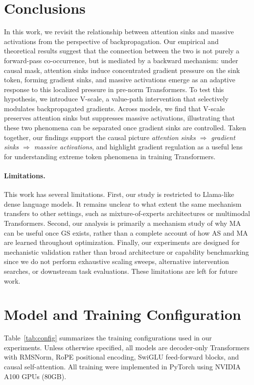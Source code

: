 \documentclass{article}
\theoremstyle{plain}
\theoremstyle{definition}
\theoremstyle{remark}
\begin{document}
\section{Conclusions}
In this work, we revisit the relationship between attention sinks and massive activations from the perspective of backpropagation.
Our empirical and theoretical results suggest that the connection between the two is not purely a forward-pass co-occurrence, but is mediated by a backward mechanism: under causal mask, attention sinks induce concentrated gradient pressure on the sink token, forming gradient sinks, and massive activations emerge as an adaptive response to this localized pressure in pre-norm Transformers.
To test this hypothesis, we introduce V-scale, a value-path intervention that selectively modulates backpropagated gradients. Across models, we find that V-scale preserves attention sinks but suppresses massive activations, illustrating that these two phenomena can be separated once gradient sinks are controlled.
Taken together, our findings support the causal picture \emph{attention sinks $\Rightarrow$ gradient sinks $\Rightarrow$ massive activations}, and highlight gradient regulation as a useful lens for understanding extreme token phenomena in training Transformers.

\paragraph{Limitations.} 
This work has several limitations.
First, our study is restricted to Llama-like dense language models. It remains unclear to what extent the same mechanism transfers to other settings, such as mixture-of-experts architectures or multimodal Transformers.
Second, our analysis is primarily a mechanism study of why MA can be useful once GS exists, rather than a complete account of how AS and MA are learned throughout optimization.
Finally, our experiments are designed for mechanistic validation rather than broad architecture or capability benchmarking since we do not perform exhaustive scaling sweeps, alternative intervention searches, or downstream task evaluations.
These limitations are left for future work.




\appendix

\section{Model and Training Configuration}\label{app:config}
Table~\ref{tab:config} summarizes the training configurations used in our experiments.
Unless otherwise specified, all models are decoder-only Transformers with RMSNorm, RoPE positional encoding, SwiGLU feed-forward blocks, and causal self-attention. All training were implemented in PyTorch using NVIDIA A100 GPUs (80GB).
\end{document}
